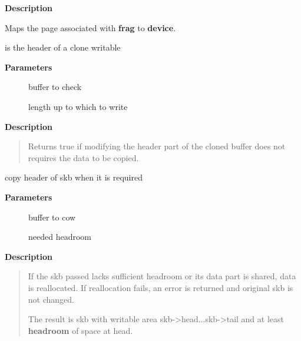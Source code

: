 \documentclass[a4paper,8pt,english]{sphinxmanual}
\begin{document}
\textbf{Description}

Maps the page associated with \textbf{frag} to \textbf{device}.

\begin{fulllineitems}
\label{networking/kapi:c.skb_clone_writable}
is the header of a clone writable

\end{fulllineitems}


\textbf{Parameters}
\begin{description}
\item[{}] \leavevmode
buffer to check

\item[{}] \leavevmode
length up to which to write

\end{description}

\textbf{Description}
\begin{quote}

Returns true if modifying the header part of the cloned buffer
does not requires the data to be copied.
\end{quote}

\begin{fulllineitems}
\label{networking/kapi:c.skb_cow}
copy header of skb when it is required

\end{fulllineitems}


\textbf{Parameters}
\begin{description}
\item[{}] \leavevmode
buffer to cow

\item[{}] \leavevmode
needed headroom

\end{description}

\textbf{Description}
\begin{quote}

If the skb passed lacks sufficient headroom or its data part
is shared, data is reallocated. If reallocation fails, an error
is returned and original skb is not changed.

The result is skb with writable area skb-\textgreater{}head...skb-\textgreater{}tail
and at least \textbf{headroom} of space at head.
\end{quote}
\end{document}
